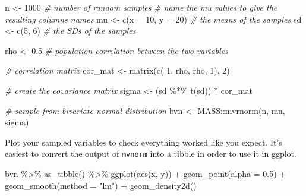 \documentclass[
  oneside]{book}
\newenvironment{Shaded}{\begin{snugshade}}{\end{snugshade}}
\newcommand{\AttributeTok}[1]{\textcolor[rgb]{0.77,0.63,0.00}{#1}}
\newcommand{\CommentTok}[1]{\textcolor[rgb]{0.56,0.35,0.01}{\textit{#1}}}
\newcommand{\DecValTok}[1]{\textcolor[rgb]{0.00,0.00,0.81}{#1}}
\newcommand{\FloatTok}[1]{\textcolor[rgb]{0.00,0.00,0.81}{#1}}
\newcommand{\FunctionTok}[1]{\textcolor[rgb]{0.00,0.00,0.00}{#1}}
\newcommand{\NormalTok}[1]{#1}
\newcommand{\OtherTok}[1]{\textcolor[rgb]{0.56,0.35,0.01}{#1}}
\newcommand{\SpecialCharTok}[1]{\textcolor[rgb]{0.00,0.00,0.00}{#1}}
\newcommand{\StringTok}[1]{\textcolor[rgb]{0.31,0.60,0.02}{#1}}
\begin{document}
\begin{Shaded}
\begin{Highlighting}[]
\NormalTok{n   }\OtherTok{\textless{}{-}} \DecValTok{1000} \CommentTok{\# number of random samples}
\CommentTok{\# name the mu values to give the resulting columns names}
\NormalTok{mu     }\OtherTok{\textless{}{-}} \FunctionTok{c}\NormalTok{(}\AttributeTok{x =} \DecValTok{10}\NormalTok{, }\AttributeTok{y =} \DecValTok{20}\NormalTok{) }\CommentTok{\# the means of the samples}
\NormalTok{sd }\OtherTok{\textless{}{-}} \FunctionTok{c}\NormalTok{(}\DecValTok{5}\NormalTok{, }\DecValTok{6}\NormalTok{)   }\CommentTok{\# the SDs of the samples}

\NormalTok{rho }\OtherTok{\textless{}{-}} \FloatTok{0.5}  \CommentTok{\# population correlation between the two variables}

\CommentTok{\# correlation matrix}
\NormalTok{cor\_mat }\OtherTok{\textless{}{-}} \FunctionTok{matrix}\NormalTok{(}\FunctionTok{c}\NormalTok{(  }\DecValTok{1}\NormalTok{, rho, }
\NormalTok{                    rho,   }\DecValTok{1}\NormalTok{), }\DecValTok{2}\NormalTok{) }

\CommentTok{\# create the covariance matrix}
\NormalTok{sigma }\OtherTok{\textless{}{-}}\NormalTok{ (sd }\SpecialCharTok{\%*\%} \FunctionTok{t}\NormalTok{(sd)) }\SpecialCharTok{*}\NormalTok{ cor\_mat}

\CommentTok{\# sample from bivariate normal distribution}
\NormalTok{bvn }\OtherTok{\textless{}{-}}\NormalTok{ MASS}\SpecialCharTok{::}\FunctionTok{mvrnorm}\NormalTok{(n, mu, sigma) }
\end{Highlighting}
\end{Shaded}

Plot your sampled variables to check everything worked like you expect. It's easiest to convert the output of \texttt{mvnorm} into a tibble in order to use it in ggplot.

\begin{Shaded}
\begin{Highlighting}[]
\NormalTok{bvn }\SpecialCharTok{\%\textgreater{}\%}
  \FunctionTok{as\_tibble}\NormalTok{() }\SpecialCharTok{\%\textgreater{}\%}
  \FunctionTok{ggplot}\NormalTok{(}\FunctionTok{aes}\NormalTok{(x, y)) }\SpecialCharTok{+}
    \FunctionTok{geom\_point}\NormalTok{(}\AttributeTok{alpha =} \FloatTok{0.5}\NormalTok{) }\SpecialCharTok{+} 
    \FunctionTok{geom\_smooth}\NormalTok{(}\AttributeTok{method =} \StringTok{"lm"}\NormalTok{) }\SpecialCharTok{+}
    \FunctionTok{geom\_density2d}\NormalTok{()}
\end{Highlighting}
\end{Shaded}
\end{document}
